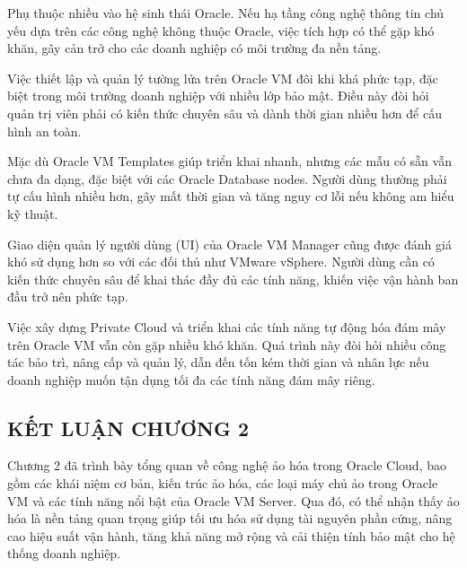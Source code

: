 \begin{myitem}
  \begin{mysubitem}
    \item Phụ thuộc nhiều vào hệ sinh thái Oracle. Nếu hạ tầng công nghệ thông tin chủ yếu dựa trên các công nghệ không thuộc Oracle, việc tích hợp có thể gặp khó khăn, gây cản trở cho các doanh nghiệp có môi trường đa nền tảng.
    
    \item Việc thiết lập và quản lý tường lửa trên Oracle VM đôi khi khá phức tạp, đặc biệt trong môi trường doanh nghiệp với nhiều lớp bảo mật. Điều này đòi hỏi quản trị viên phải có kiến thức chuyên sâu và dành thời gian nhiều hơn để cấu hình an toàn.
    
    \item Mặc dù Oracle VM Templates giúp triển khai nhanh, nhưng các mẫu có sẵn vẫn chưa đa dạng, đặc biệt với các Oracle Database nodes. Người dùng thường phải tự cấu hình nhiều hơn, gây mất thời gian và tăng nguy cơ lỗi nếu không am hiểu kỹ thuật.
    
    \item Giao diện quản lý người dùng (UI) của Oracle VM Manager cũng được đánh giá khó sử dụng hơn so với các đối thủ như VMware vSphere. Người dùng cần có kiến thức chuyên sâu để khai thác đầy đủ các tính năng, khiến việc vận hành ban đầu trở nên phức tạp.
    
    \item Việc xây dựng Private Cloud và triển khai các tính năng tự động hóa đám mây trên Oracle VM vẫn còn gặp nhiều khó khăn. Quá trình này đòi hỏi nhiều công tác bảo trì, nâng cấp và quản lý, dẫn đến tốn kém thời gian và nhân lực nếu doanh nghiệp muốn tận dụng tối đa các tính năng đám mây riêng.
  \end{mysubitem}

\end{myitem}

\newpage
\subsection*{\centering KẾT LUẬN CHƯƠNG 2}

Chương 2 đã trình bày tổng quan về công nghệ ảo hóa trong Oracle Cloud, bao gồm các khái niệm cơ bản, kiến trúc ảo hóa, các loại máy chủ ảo trong Oracle VM và các tính năng nổi bật của Oracle VM Server. Qua đó, có thể nhận thấy ảo hóa là nền tảng quan trọng giúp tối ưu hóa sử dụng tài nguyên phần cứng, nâng cao hiệu suất vận hành, tăng khả năng mở rộng và cải thiện tính bảo mật cho hệ thống doanh nghiệp.

